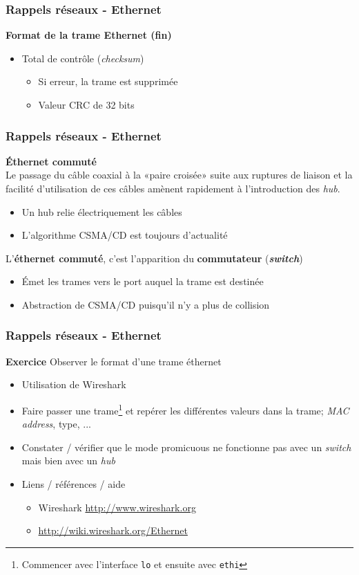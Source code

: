 \begin{frame}[fragile]
  \frametitle{Rappels réseaux - Ethernet}
{\large\bf Format de la trame Ethernet (fin)}
\begin{itemize}
	\item Total de contrôle (\textit{checksum})
	\begin{itemize}
		\item Si erreur, la trame est supprimée
		\item Valeur CRC de 32 bits
	\end{itemize}
\end{itemize}
\end{frame}

\begin{frame}[fragile]
  \frametitle{Rappels réseaux - Ethernet}
{\large\bf Éthernet commuté}\\
Le passage du câble coaxial à la «paire croisée» suite aux ruptures de liaison
et la facilité d'utilisation de ces câbles amènent rapidement à l'introduction
des \textit{hub}. 
\begin{itemize}
	\item Un hub relie électriquement les câbles
	\item L'algorithme CSMA/CD est toujours d'actualité
\end{itemize}

L'\textbf{éthernet commuté}, c'est l'apparition du \textbf{commutateur}
(\textbf{\textit{switch}})
\begin{itemize}
	\item Émet les trames vers le port auquel la trame est destinée
	\item Abstraction de CSMA/CD puisqu'il n'y a plus de collision
\end{itemize}
\end{frame}


\begin{frame}[fragile]
  \frametitle{Rappels réseaux - Ethernet}
{\large\bf Exercice}
Observer le format d'une trame éthernet 
\begin{itemize}
	\item Utilisation de Wireshark
	\item Faire passer une trame\footnote{Commencer avec l'interface \texttt{lo}
	et ensuite avec \texttt{ethi}} 
	et repérer les différentes valeurs dans la
	trame; \textit{MAC address}, type, ...
	\item Constater / vérifier que le mode promicuous ne fonctionne pas avec un
	\textit{switch} mais bien avec un \textit{hub}
	\item Liens / références / aide
	\begin{itemize}
		\item Wireshark \url{http://www.wireshark.org}
		\item\url{http://wiki.wireshark.org/Ethernet}
	\end{itemize}
\end{itemize}
\end{frame}


